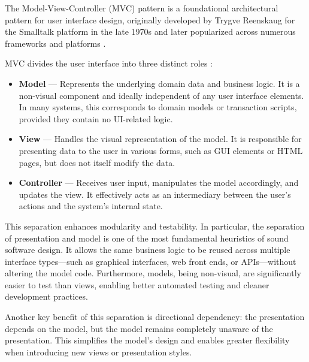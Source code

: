 \documentclass[
  digital,     %
  oneside,     %
  nosansbold,  %
  nocolorbold, %
  lof,         %
  lot,         %
]{fithesis4}
\begin{document}
The Model-View-Controller (\gls{MVC}) pattern is a foundational architectural pattern for user interface design, originally developed by Trygve Reenskaug for the Smalltalk platform in the late 1970s and later popularized across numerous frameworks and platforms \cite{fowlerPEAA}.

\gls{MVC} divides the user interface into three distinct roles \cite{mdnMVC}:

\noindent
\begin{itemize}
    \item \textbf{Model} — Represents the underlying domain data and business logic. It is a non-visual component and ideally independent of any user interface elements. In many systems, this corresponds to domain models or transaction scripts, provided they contain no \gls{UI}-related logic.
    \item \textbf{View} — Handles the visual representation of the model. It is responsible for presenting data to the user in various forms, such as \gls{GUI} elements or \gls{HTML} pages, but does not itself modify the data.
    \item \textbf{Controller} — Receives user input, manipulates the model accordingly, and updates the view. It effectively acts as an intermediary between the user's actions and the system's internal state.
\end{itemize}

This separation enhances modularity and testability. In particular, the separation of presentation and model is one of the most fundamental heuristics of sound software design. It allows the same business logic to be reused across multiple interface types—such as graphical interfaces, web front ends, or APIs—without altering the model code. Furthermore, models, being non-visual, are significantly easier to test than views, enabling better automated testing and cleaner development practices.

Another key benefit of this separation is directional dependency: the presentation depends on the model, but the model remains completely unaware of the presentation. This simplifies the model’s design and enables greater flexibility when introducing new views or presentation styles.
\end{document}
